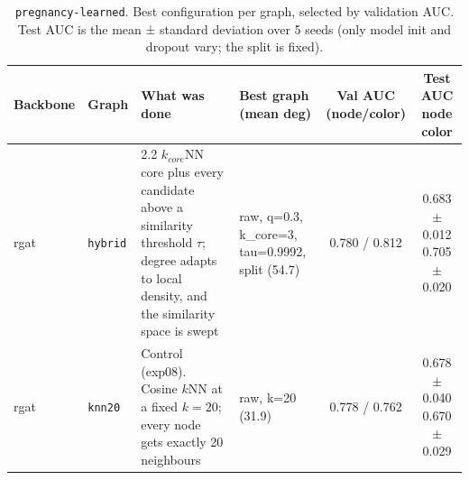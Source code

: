 \begin{table}[t]
\centering
\small
\begin{tabularx}{\textwidth}{llXlcc}
\toprule
Backbone & Graph & What was done & \makecell{Best graph\\(mean deg)} & \makecell{Val AUC\\(node/color)} & \makecell{Test AUC\\node\\color} \\
\midrule
rgat & \texttt{hybrid} & 2.2 $k_{core}$NN core plus every candidate above a similarity threshold $\tau$; degree adapts to local density, and the similarity space is swept & raw, q=0.3, k\_core=3, tau=0.9992, split (54.7) & 0.780 / 0.812 & \makecell{0.683 $\pm$ 0.012\\0.705 $\pm$ 0.020} \\
rgat & \texttt{knn20} & Control (exp08). Cosine $k$NN at a fixed $k=20$; every node gets exactly 20 neighbours & raw, k=20 (31.9) & 0.778 / 0.762 & \makecell{0.678 $\pm$ 0.040\\0.670 $\pm$ 0.029} \\
\bottomrule
\end{tabularx}
\caption{\texttt{pregnancy-learned}. Best configuration per graph, selected by validation AUC. Test AUC is the mean ± standard deviation over 5 seeds (only model init and dropout vary; the split is fixed).}
\label{tab:exp10-graph}
\end{table}
